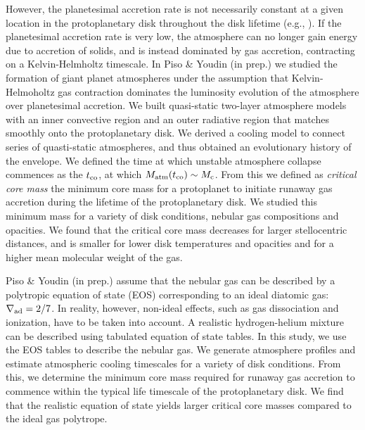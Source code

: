\documentclass[apj]{emulateapj}
\newcommand{\delad}{\nabla_{\rm ad}}
\begin{document}
However, the planetesimal accretion rate is not necessarily constant at a given location in the protoplanetary disk throughout the disk lifetime (e.g., \citealt{ikoma00}). If the planetesimal accretion rate is very low, the atmosphere can no longer gain energy due to accretion of solids, and is instead dominated by gas accretion, contracting on a Kelvin-Helmholtz timescale. In Piso \& Youdin (in prep.) we studied the formation of giant planet atmospheres under the assumption that Kelvin-Helmoholtz gas contraction dominates the luminosity evolution of the atmosphere over planetesimal accretion. We built quasi-static two-layer atmosphere models with an inner convective region and an outer radiative region that matches smoothly onto the protoplanetary disk. We derived a cooling model to connect series of quasti-static atmospheres, and thus obtained an evolutionary history of the envelope. We defined the time at which unstable atmosphere collapse commences as the  $t_{\rm{co}}$, at which  $M_{\rm atm}(t_{\rm{co}})\sim M_{\rm c}$. From this we defined as \textit{critical core mass} the minimum core mass for a protoplanet to initiate runaway gas accretion during the lifetime of the protoplanetary disk. We studied this minimum mass for a variety of disk conditions, nebular gas compositions and opacities. We found that the critical core mass decreases for larger stellocentric distances, and is smaller for lower disk temperatures and opacities and for a higher mean molecular weight of the gas. 
 
 
 Piso \& Youdin (in prep.) assume that the nebular gas can be described by a polytropic equation of state (EOS) corresponding to an ideal diatomic gas: $\delad=2/7$. In reality, however, non-ideal effects, such as gas dissociation and ionization, have to be taken into account. A realistic hydrogen-helium mixture can be described using tabulated equation of state tables. In this study, we use the \cite{saumon95} EOS tables to describe the nebular gas. We generate atmosphere profiles and estimate atmospheric cooling timescales for a variety of disk conditions. From this, we determine the minimum core mass required for runaway gas accretion to commence within the typical life timescale of the protoplanetary disk.  We find that the realistic equation of state yields larger critical core masses compared to the ideal gas polytrope. %
\end{document}
